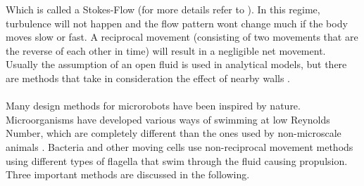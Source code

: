Which is called a Stokes-Flow (for more details refer to  \cite{Purcell1977}). In this regime, turbulence will not happen and the flow pattern wont change much if the body moves slow or fast. A reciprocal movement (consisting of two movements that are the reverse of each other in time) will result in a negligible net movement. Usually the assumption of an open fluid is used in analytical models, but there are methods that take in consideration the effect of nearby walls \cite{Nelson2010}.\\\\
Many design methods for microrobots have been inspired by nature. Microorganisms have developed various ways of swimming at low Reynolds Number, which are completely different than the ones used by non-microscale animals \cite{Vogel2003}. Bacteria and other moving cells use non-reciprocal movement methods using different types of flagella that swim through the fluid causing propulsion. Three important methods are discussed in the following.


